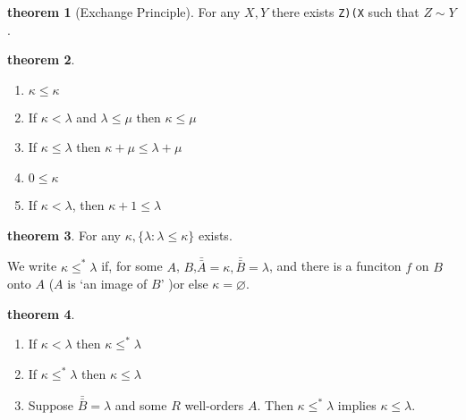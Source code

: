 \documentclass[a4paper,11pt]{article}%
\theoremstyle{remark}
\theoremstyle{definition}
\newtheorem{theorem}{theorem}[section]
\theoremstyle{definition}
\theoremstyle{plain}
\theoremstyle{definition}
\begin{document}
\begin{theorem}[Exchange Principle]
    For any $X,Y$ there exists \verb+Z)(X+ such that $Z\sim Y$.
\end{theorem}
\begin{theorem}
    \begin{enumerate}
        \item $\kappa\leq \kappa$
        \item If $\kappa<\lambda$ and $\lambda\leq \mu$ then $\kappa\leq \mu$
        \item If $\kappa\leq \lambda$ then $\kappa+\mu\leq\lambda+\mu$
        \item $0\leq \kappa$
        \item If $\kappa<\lambda$, then $\kappa+1\leq\lambda$
    \end{enumerate}
\end{theorem}
\begin{theorem}
    For any $\kappa,\{\lambda:\lambda\leq \kappa\}$ exists.
\end{theorem}
We write $\kappa\leq^*\lambda$ if, for some $A$, $B$,$\bar{\bar{A}}=\kappa,\bar{\bar{B}}=\lambda$,
and there is a funciton $f$ on $B$ onto $A$ ($A$ is `an image of $B$' )or else $\kappa=\varnothing$.
\begin{theorem}
    \begin{enumerate}
    \item If $\kappa<\lambda$ then $\kappa\leq^*\lambda$
        \item If $\kappa\leq^*\lambda$ then $\kappa\leq\lambda$
        \item Suppose $\bar{\bar{B}}=\lambda$ and some $R$ well-orders $A$. Then $\kappa\leq^*\lambda$ implies $\kappa\leq \lambda$.
    \end{enumerate}
\end{theorem}
\end{document}
